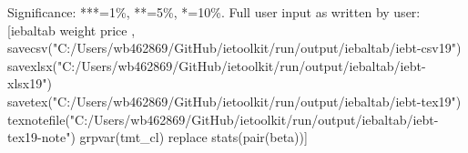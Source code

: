 Significance: ***=1\%, **=5\%, *=10\%. Full user input as written by user: [iebaltab weight price , savecsv("C:/Users/wb462869/GitHub/ietoolkit/run/output/iebaltab/iebt-csv19") savexlsx("C:/Users/wb462869/GitHub/ietoolkit/run/output/iebaltab/iebt-xlsx19") savetex("C:/Users/wb462869/GitHub/ietoolkit/run/output/iebaltab/iebt-tex19") texnotefile("C:/Users/wb462869/GitHub/ietoolkit/run/output/iebaltab/iebt-tex19-note") grpvar(tmt\_cl) replace stats(pair(beta))]
